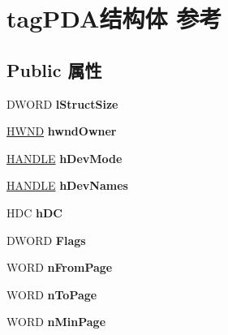 \hypertarget{structtag_p_d_a}{}\section{tag\+P\+D\+A结构体 参考}
\label{structtag_p_d_a}
\subsection*{Public 属性}
\begin{DoxyCompactItemize}
\item 
\mbox{\label{structtag_p_d_a_afa6eb9d13ab523fbfdeda46731a51e96}} 
D\+W\+O\+RD {\bfseries l\+Struct\+Size}
\item 
\mbox{\label{structtag_p_d_a_af7c8789cf9d80577baaabfed08b8eceb}} 
\hyperlink{interfacevoid}{H\+W\+ND} {\bfseries hwnd\+Owner}
\item 
\mbox{\label{structtag_p_d_a_a5993cd2bb59e7b672585f67dc52aca0c}} 
\hyperlink{interfacevoid}{H\+A\+N\+D\+LE} {\bfseries h\+Dev\+Mode}
\item 
\mbox{\label{structtag_p_d_a_adb6252130aded23a149c3b5525257428}} 
\hyperlink{interfacevoid}{H\+A\+N\+D\+LE} {\bfseries h\+Dev\+Names}
\item 
\mbox{\label{structtag_p_d_a_a133c722443c6fc1153269c491192f473}} 
H\+DC {\bfseries h\+DC}
\item 
\mbox{\label{structtag_p_d_a_a57b447a105943016628588ad4220b2be}} 
D\+W\+O\+RD {\bfseries Flags}
\item 
\mbox{\label{structtag_p_d_a_a8b87c5ab2af16e21eceb162de76694e5}} 
W\+O\+RD {\bfseries n\+From\+Page}
\item 
\mbox{\label{structtag_p_d_a_a9db812ea24b4122644dd5dfa3d0f98dc}} 
W\+O\+RD {\bfseries n\+To\+Page}
\item 
\mbox{\label{structtag_p_d_a_ac9677a34a2bbd57a47d0bdbfa4fdda8b}} 
W\+O\+RD {\bfseries n\+Min\+Page}
\item 
\mbox{\label{structtag_p_d_a_a02a1f790850db9e735df95c8710be914}} 

\end{DoxyCompactItemize}
